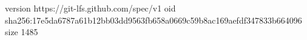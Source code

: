 version https://git-lfs.github.com/spec/v1
oid sha256:17e5da6787a61b12bb03dd9563fb658a0669c59b8ac169aefdf347833b664096
size 1485
